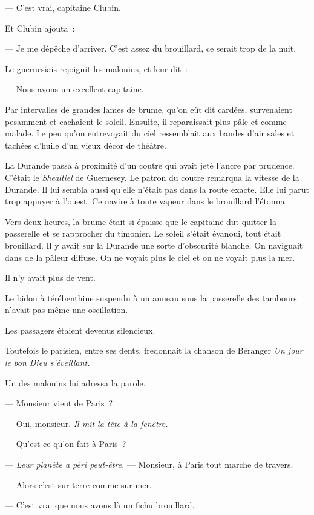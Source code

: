 \documentclass[french,twoside]{book} %
\begin{document}
— C’est vrai, capitaine Clubin.\par
Et Clubin ajouta :\par
— Je me dépêche d’arriver. C’est assez du brouillard, ce serait trop de la nuit.\par
Le guernesiais rejoignit les malouins, et leur dit :\par
— Nous avons un excellent capitaine.\par
Par intervalles de grandes lames de brume, qu’on eût dit cardées, survenaient pesamment et cachaient le soleil. Ensuite, il reparaissait plus pâle et comme malade. Le peu qu’on entrevoyait du ciel ressemblait aux bandes d’air sales et tachées d’huile d’un vieux décor de théâtre.\par
La Durande passa à proximité d’un coutre qui avait jeté l’ancre par prudence. C’était le \emph{Shealtiel} de Guernesey. Le patron du coutre remarqua la vitesse de la Durande. Il lui sembla aussi qu’elle n’était pas dans la route exacte. Elle lui parut trop appuyer à l’ouest. Ce navire à toute vapeur dans le brouillard l’étonna.\par
Vers deux heures, la brume était si épaisse que le capitaine dut quitter la passerelle et se rapprocher du timonier. Le soleil s’était évanoui, tout était brouillard. Il y avait sur la Durande une sorte d’obscurité blanche.  On naviguait dans de la pâleur diffuse. On ne voyait plus le ciel et on ne voyait plus la mer.\par
Il n’y avait plus de vent.\par
Le bidon à térébenthine suspendu à un anneau sous la passerelle des tambours n’avait pas même une oscillation.\par
Les passagers étaient devenus silencieux.\par
Toutefois le parisien, entre ses dents, fredonnait la chanson de Béranger \emph{Un jour le bon Dieu s’éveillant.}\par
Un des malouins lui adressa la parole.\par
— Monsieur vient de Paris ?\par
— Oui, monsieur. \emph{Il mit la tête à la fenêtre.}\par
— Qu’est-ce qu’on fait à Paris ?\par
— \emph{Leur planète a péri peut-être.} — Monsieur, à Paris tout marche de travers.\par
— Alors c’est sur terre comme sur mer.\par
— C’est vrai que nous avons là un fichu brouillard.\par
\end{document}
